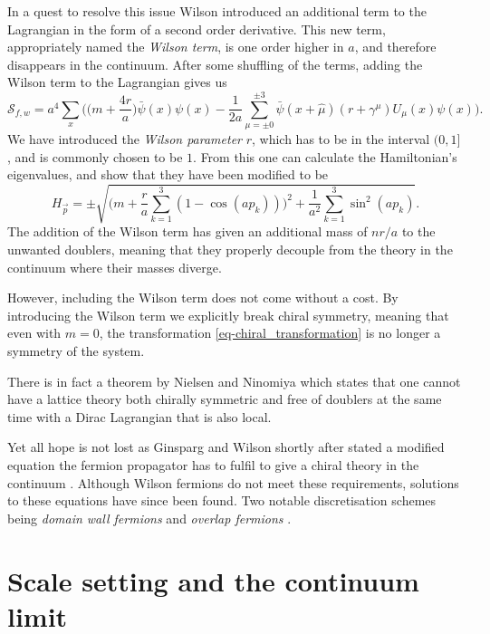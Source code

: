 In a quest to resolve this issue Wilson introduced an additional term to the
Lagrangian in the form of a second order derivative. This new term,
appropriately named the \emph{Wilson term}, is one order higher in $a$, and therefore
disappears in the continuum. After some shuffling of the terms, adding the
Wilson term to the Lagrangian gives us
%
\begin{equation}
  \mathcal{S}_{f,w} = a^4 \sum_{x} \bigg(
  \big(m + {\textstyle\frac{4 r}{a}}\big) \bar{\psi}(x) \psi(x)
  - \frac{1}{2a} \sum_{\mu = \pm 0}^{\pm 3} \bar{\psi}(x+\hat{\mu}) (r +
  \gamma^{\mu}) U_{\mu}(x) \psi(x) \bigg).
\end{equation}
%
We have introduced the \emph{Wilson parameter} $r$, which has to be in the
interval $(0, 1]$, and is commonly chosen to be $1$. From this one can calculate
the Hamiltonian's eigenvalues, and show that they have been modified to be
%
\begin{equation}
  H_{\vec{p}} = \pm \sqrt{\bigg(m + \frac{r}{a}\sum_{k=1}^3 (1 - \cos (a p_k) ) \bigg)^2
    + \frac{1}{a^2} \sum_{k=1}^3 \sin^2 (a p_k)}.
\end{equation}
%
The addition of the Wilson term has given an additional mass of $n r/a$ to the
unwanted doublers, meaning that they properly decouple from the theory in the
continuum where their masses diverge. 

However, including the Wilson term does not come without a cost. By
introducing the Wilson term we explicitly break chiral symmetry, meaning that
even with $m=0$, the transformation \eqref{eq-chiral_transformation} is no
longer a symmetry of the system. 

There is in fact a theorem by Nielsen and Ninomiya
\citep{Nielsen:1980rz,Nielsen:1981xu} which states that one cannot have a lattice
theory both chirally symmetric and free of doublers at the same time with a
Dirac Lagrangian that is also local.

Yet all hope is not lost as Ginsparg and Wilson shortly after stated a modified
equation the fermion propagator has to fulfil to give a chiral theory in the
continuum \citep{Ginsparg:1981bj}. Although Wilson fermions do not meet these
requirements, solutions to these equations have since been found. Two notable
discretisation schemes being \emph{domain wall fermions} \citep{Kaplan:1992bt} and 
\emph{overlap fermions} \citep{Neuberger:1997fp,Neuberger:1998wv}.

\section{Scale setting and the continuum limit} \label{sec-scale_setting}

